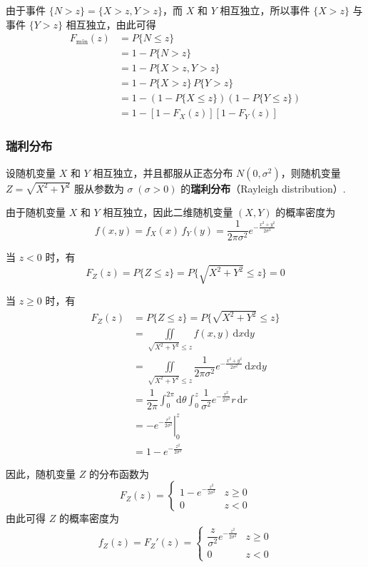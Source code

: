 由于事件 $\{N>z\} = \{X>z, Y>z\}$，而 $X$ 和 $Y$ 相互独立，所以事件 $\{X>z\}$ 与事件 $\{Y>z\}$ 相互独立，由此可得
$$
\begin{aligned}
    F_{\text{min}}(z) &= P\{N \leqslant z\} \\
    &= 1 - P\{N>z\} \\
    &= 1 - P\{X>z, Y>z\} \\
    &= 1 - P\{X>z\} \, P\{Y>z\} \\
    &= 1 - (1 - P\{X \leqslant z\})(1 - P\{Y \leqslant z\}) \\
    &= 1 - [1 - F_{X}(z)][1 - F_{Y}(z)]
\end{aligned}
$$

\subsubsection{瑞利分布}

设随机变量 $X$ 和 $Y$ 相互独立，并且都服从正态分布 $N(0, \sigma^2)$，则随机变量 $Z = \sqrt{X^2 + Y^2}$ 服从参数为 $\sigma \; (\sigma > 0)$ 的\textbf{瑞利分布}（Rayleigh distribution）.

由于随机变量 $X$ 和 $Y$ 相互独立，因此二维随机变量 $(X,Y)$ 的概率密度为
$$
f(x,y) = f_{X}(x) \, f_{Y}(y) = \dfrac{1}{2 \pi \sigma^2} e^{-\frac{x^2 + y^2}{2 \sigma^2}}
$$

当 $z<0$ 时，有
$$
F_{Z}(z) = P\{Z \leqslant z\} = P\{\sqrt{X^2 + Y^2} \leqslant z\} = 0
$$

当 $z \geqslant 0$ 时，有
$$
\begin{aligned}
    F_{Z}(z) &= P\{Z \leqslant z\} = P\{\sqrt{X^2 + Y^2} \leqslant z\} \\
    &= \underset{\sqrt{X^2 + Y^2} \leqslant z}{\iint} f(x,y) \, \text{d}x \text{d}y \\
    &= \underset{\sqrt{X^2 + Y^2} \leqslant z}{\iint} \dfrac{1}{2 \pi \sigma^2} e^{-\frac{x^2 + y^2}{2 \sigma^2}} \, \text{d}x \text{d}y \\
    &= \dfrac{1}{2 \pi} \int_0^{2 \pi} \text{d}\theta \int_0^z \dfrac{1}{\sigma^2} e^{-\frac{r^2}{2 \sigma^2}} r \, \text{d}r \\
    &= \left. -e^{-\frac{r^2}{2 \sigma^2}} \right|_0^z \\
    &= 1 - e^{-\frac{z^2}{2 \sigma^2}}
\end{aligned}
$$

因此，随机变量 $Z$ 的分布函数为
$$
F_{Z}(z) = \begin{cases}
    1 - e^{-\frac{z^2}{2 \sigma^2}} & z \geqslant 0 \\
    0 & z<0
\end{cases}
$$
由此可得 $Z$ 的概率密度为
$$
f_{Z}(z) = F_{Z}'(z) = \begin{cases}
    \dfrac{z}{\sigma^2} e^{-\frac{z^2}{2 \sigma^2}} & z \geqslant 0 \\[0.5em]
    0 & z<0
\end{cases}
$$

